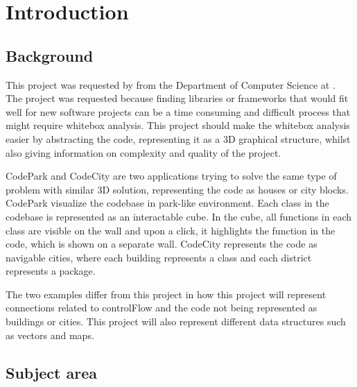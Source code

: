 \chapter{Introduction}
\label{chap:introduction}

\section{Background}
This project was requested by \productowner{} from the Department of Computer Science at \NTNUgjovik. The project was requested because finding libraries or frameworks that would fit well for new software projects can be a time consuming and difficult process that might require \gls{whitebox} analysis. This project should make the \gls{whitebox} analysis easier by abstracting the code, representing it as a 3D graphical structure, whilst also giving information on complexity and quality of the project. 

CodePark \cite{DBLP:journals/corr/abs-1708-02174} and CodeCity \cite{wettel2010software} are two applications trying to solve the same type of problem with similar 3D solution, representing the code as houses or city blocks. CodePark visualize the codebase in park-like environment. Each class in the codebase is represented as an interactable cube. In the cube, all functions in each class are visible on the wall and upon a click, it highlights the function in the code, which is shown on a separate wall. CodeCity represents the code as navigable cities, where each building represents a class and each district represents a package.

The two examples differ from this project in how this project will represent connections related to \gls{controlFlow} and the code not being represented as buildings or cities. This project will also represent different data structures such as vectors and maps.

\section{Subject area}

